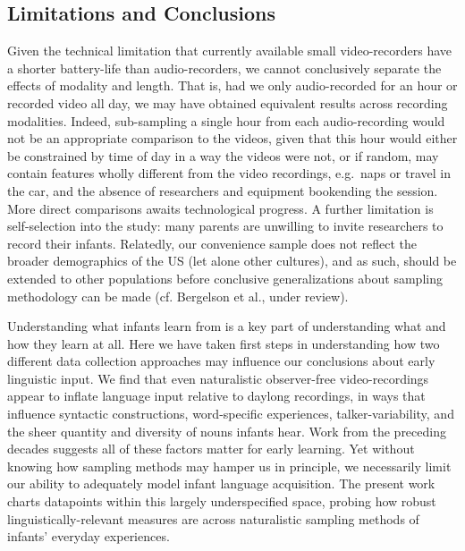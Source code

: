 \documentclass[man]{apa6}
\theoremstyle{definition}
\theoremstyle{definition}
\theoremstyle{definition}
\theoremstyle{remark}
\begin{document}
\subsection{Limitations and
Conclusions}\label{limitations-and-conclusions}

Given the technical limitation that currently available small
video-recorders have a shorter battery-life than audio-recorders, we
cannot conclusively separate the effects of modality and length. That
is, had we only audio-recorded for an hour or recorded video all day, we
may have obtained equivalent results across recording modalities.
Indeed, sub-sampling a single hour from each audio-recording would not
be an appropriate comparison to the videos, given that this hour would
either be constrained by time of day in a way the videos were not, or if
random, may contain features wholly different from the video recordings,
e.g.~naps or travel in the car, and the absence of researchers and
equipment bookending the session. More direct comparisons awaits
technological progress. A further limitation is self-selection into the
study: many parents are unwilling to invite researchers to record their
infants. Relatedly, our convenience sample does not reflect the broader
demographics of the US (let alone other cultures), and as such, should
be extended to other populations before conclusive generalizations about
sampling methodology can be made (cf. Bergelson et al., under review).

Understanding what infants learn from is a key part of understanding
what and how they learn at all. Here we have taken first steps in
understanding how two different data collection approaches may influence
our conclusions about early linguistic input. We find that even
naturalistic observer-free video-recordings appear to inflate language
input relative to daylong recordings, in ways that influence syntactic
constructions, word-specific experiences, talker-variability, and the
sheer quantity and diversity of nouns infants hear. Work from the
preceding decades suggests all of these factors matter for early
learning. Yet without knowing how sampling methods may hamper us in
principle, we necessarily limit our ability to adequately model infant
language acquisition. The present work charts datapoints within this
largely underspecified space, probing how robust linguistically-relevant
measures are across naturalistic sampling methods of infants' everyday
experiences.\newpage
\end{document}

